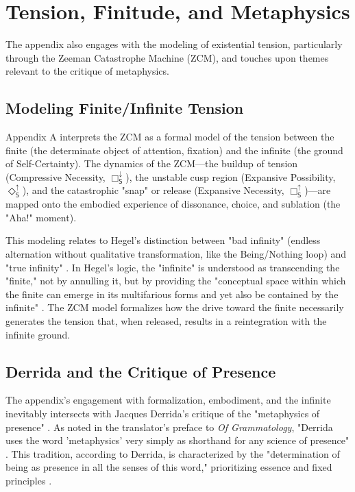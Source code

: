 \documentclass[12pt]{article}
\newcommand{\SBoxUp}{\Box_{\mathsf{S}}^{\uparrow}}
\newcommand{\SBoxDown}{\Box_{\mathsf{S}}^{\downarrow}}
\newcommand{\SDiaUp}{\Diamond_{\mathsf{S}}^{\uparrow}}
\begin{document}
\section{Tension, Finitude, and Metaphysics}

The appendix also engages with the modeling of existential tension, particularly through the Zeeman Catastrophe Machine (ZCM), and touches upon themes relevant to the critique of metaphysics.

\subsection{Modeling Finite/Infinite Tension}

Appendix A interprets the ZCM as a formal model of the tension between the finite (the determinate object of attention, fixation) and the infinite (the ground of Self-Certainty). The dynamics of the ZCM—the buildup of tension (Compressive Necessity, $\SBoxDown$), the unstable cusp region (Expansive Possibility, $\SDiaUp$), and the catastrophic "snap" or release (Expansive Necessity, $\SBoxUp$)—are mapped onto the embodied experience of dissonance, choice, and sublation (the "Aha!" moment).

This modeling relates to Hegel's distinction between "bad infinity" (endless alternation without qualitative transformation, like the Being/Nothing loop) and "true infinity" \parencite{inwood1992hegel}. In Hegel's logic, the "infinite" is understood as transcending the "finite," not by annulling it, but by providing the "conceptual space within which the finite can emerge in its multifarious forms and yet also be contained by the infinite" \parencite[p. xxi]{Hegel:2014aa}. The ZCM model formalizes how the drive toward the finite necessarily generates the tension that, when released, results in a reintegration with the infinite ground.

\subsection{Derrida and the Critique of Presence}

The appendix's engagement with formalization, embodiment, and the infinite inevitably intersects with Jacques Derrida's critique of the "metaphysics of presence" \parencite{Derrida2011}. As noted in the translator's preface to \textit{Of Grammatology}, "Derrida uses the word 'metaphysics' very simply as shorthand for any science of presence" \parencite[p. xxi]{Derrida1997}. This tradition, according to Derrida, is characterized by the "determination of being as presence in all the senses of this word," prioritizing essence and fixed principles \parencite[p. xxi, quoting Derrida]{Derrida1997}.
\end{document}
